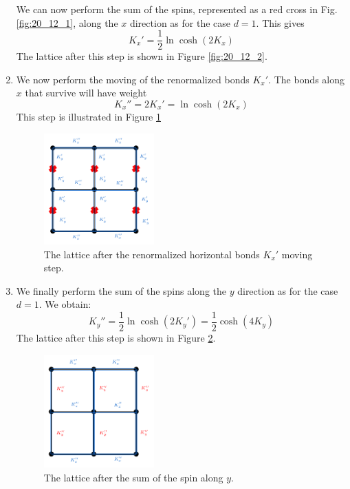 \documentclass[../../Main/Main.tex]{subfiles}
\begin{document}
\begin{enumerate}
 We can now perform the sum of the spins, represented as a red cross in Fig.\ref{fig:20_12_1}, along the \( x \) direction as for the case \( d=1 \).
This gives
\begin{equation*}
  K_x' = \frac{1}{2} \ln \cosh (2K_x)
\end{equation*}
The lattice after this step is shown in Figure \ref{fig:20_12_2}.

\item We now perform the moving of the renormalized bonds \( K_x' \).
The bonds along \( x \) that survive will have weight
\begin{equation*}
  K_x'' = 2 K_x' = \ln \cosh (2K_x)
\end{equation*}
This step is illustrated in Figure \ref{fig:20_13}

\begin{figure}[H]
\centering
\includegraphics[width=0.4\textwidth]{./img/16.pdf}
\caption{\label{fig:20_13} The lattice after the renormalized horizontal bonds \( K_x' \)  moving step.}
\end{figure}



\item We finally perform the sum of the spins along the \( y \) direction as for the case \( d=1 \).
We obtain:
\begin{equation*}
  K_y'' = \frac{1}{2} \ln \cosh (2K_y') = \frac{1}{2} \cosh (4K_y)
\end{equation*}
The lattice after this step is shown in Figure \ref{fig:20_14}.

\begin{figure}[H]
\centering
\includegraphics[width=0.4\textwidth]{./img/17.pdf}
\caption{\label{fig:20_14} The lattice after the sum of the spin along \( y \).}
\end{figure}

\end{enumerate}
\end{document}
